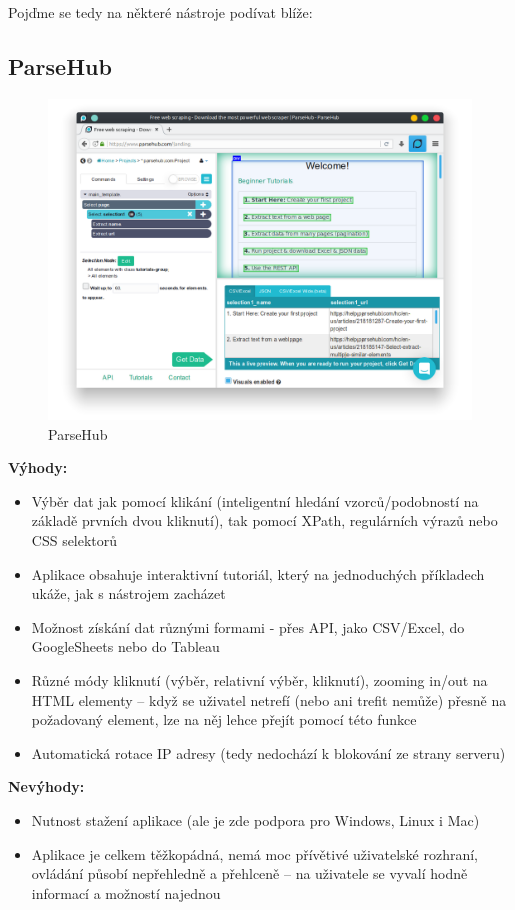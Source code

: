 \documentclass[thesis=B,czech]{FITthesis}[2012/06/26]
\begin{document}
Poj\v{d}me se tedy na některé nástroje podívat blíže:

\subsection{ParseHub}
\begin{figure}[h]
	\includegraphics[width=\linewidth]{images/ParseHub.png}
	\caption{ParseHub}
	\label{fig:parseHub}
\end{figure}

\textbf{Výhody:}
\begin{itemize}
	\item Výběr dat jak pomocí klikání (inteligentní hledání vzorců/podobností na základě prvních dvou kliknutí), tak pomocí XPath, regulárních výrazů nebo CSS selektorů
	\item Aplikace obsahuje interaktivní tutoriál, který na jednoduchých příkladech ukáže, jak s nástrojem zacházet
	\item Možnost získání dat různými formami - přes API, jako CSV/Excel, do GoogleSheets nebo do Tableau
	\item Různé módy kliknutí (výběr, relativní výběr, kliknutí), zooming in/out na HTML elementy -- když se uživatel netrefí (nebo ani trefit nemůže) přesně na požadovaný element, lze na něj lehce přejít pomocí této funkce
	\item Automatická rotace IP adresy (tedy nedochází k blokování ze strany serveru)
\end{itemize}

\textbf{Nevýhody:}
\begin{itemize}
	\item Nutnost stažení aplikace (ale je zde podpora pro Windows, Linux i Mac)
	\item Aplikace je celkem těžkopádná, nemá moc přívětivé uživatelské rozhraní, ovládání působí nepřehledně a přehlceně -- na uživatele se vyvalí hodně informací a možností najednou
\end{itemize}
\end{document}
